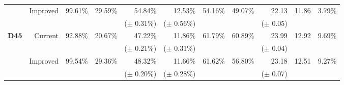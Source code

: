\begin{tabular}{lrrrrrrrrrr}
                              & \multirow{2}{*}{Improved} & \multirow{2}{*}{99.61\%}                      & \multirow{2}{*}{29.59\%}                        & 54.84\%                           & 12.53\%                              & \multirow{2}{*}{54.16\%}            & \multirow{2}{*}{49.07\%}              & 22.13                                     & \multirow{2}{*}{11.86}                      & \multirow{2}{*}{3.79\%} \\
                              &                           &                                               &                                                 & ($\pm$ 0.31\%)                    & ($\pm$ 0.56\%)                       &                                     &                                       & ($\pm$ 0.05)                              &                                             &                         \\
\midrule
\multirow{4}{*}{\textbf{D45}} & \multirow{2}{*}{Current}  & \multirow{2}{*}{92.88\%}                      & \multirow{2}{*}{20.67\%}                        & 47.22\%                           & 11.86\%                              & \multirow{2}{*}{61.79\%}            & \multirow{2}{*}{60.89\%}              & 23.99                                     & \multirow{2}{*}{12.92}                      & \multirow{2}{*}{9.69\%} \\
                              &                           &                                               &                                                 & ($\pm$ 0.21\%)                    & ($\pm$ 0.31\%)                       &                                     &                                       & ($\pm$ 0.04)                              &                                             &                         \\[2mm]
                              & \multirow{2}{*}{Improved} & \multirow{2}{*}{99.54\%}                      & \multirow{2}{*}{29.36\%}                        & 48.32\%                           & 11.66\%                              & \multirow{2}{*}{61.62\%}            & \multirow{2}{*}{56.80\%}              & 23.18                                     & \multirow{2}{*}{12.51}                      & \multirow{2}{*}{9.27\%} \\
                              &                           &                                               &                                                 & ($\pm$ 0.20\%)                    & ($\pm$ 0.28\%)                       &                                     &                                       & ($\pm$ 0.07)                              &                                             &                         \\
\bottomrule
\end{tabular}
